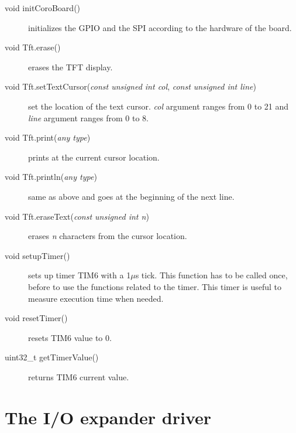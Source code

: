 \documentclass[11pt]{report}
\begin{document}
\begin{description}
     \item[void initCoroBoard()] initializes the GPIO and the SPI according to the hardware of the board.
    \item[void Tft.erase()] erases the TFT display.
    \item[void Tft.setTextCursor(\textit{const unsigned int col}, \textit{const unsigned int line})] set the location of the text cursor. \textit{col} argument ranges from 0 to 21 and \textit{line} argument ranges from 0 to 8.
    \item[void Tft.print(\textit{any type})] prints at the current cursor location. 
    \item[void Tft.println(\textit{any type})] same as above and goes at the beginning of the next line. 
    \item[void Tft.eraseText(\textit{const unsigned int n})] erases \textit{n} characters from the cursor location. 

    \item[void setupTimer()] sets up timer TIM6 with a 1$\mu$s tick. This function has to be called once, before to use the functions related to the timer. This timer is useful to measure execution time when needed.
    \item[void resetTimer()] resets TIM6 value to 0.
    \item[uint32_t getTimerValue()] returns TIM6 current value.
\end{description}


\section{The I/O expander driver}
\end{document}

